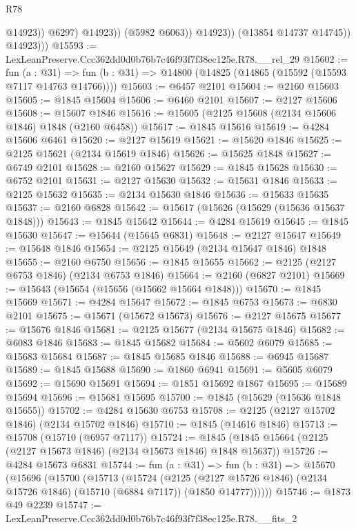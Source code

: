 \begin{lexlean}{R78}
\begin{coremodule}
                            @14923))
                        @6297)
                      @14923))
                  (@5982 @6063))
                @14923))
            (@13854 @14737 @14745))
          @14923)))
@15593 := LexLeanPreserve.Ccc362dd0d0b76b7c46f93f7f38ec125e.R78.__rel_29
@15602 := fun (a : @31) =>
  fun (b : @31) => @14800 (@14825 (@14865 (@15592 (@15593 @7117 @14763 @14766))))
@15603 := @6457 @2101
@15604 := @2160 @15603
@15605 := @1845 @15604
@15606 := @6460 @2101
@15607 := @2127 @15606
@15608 := @15607 @1846
@15616 := @15605 (@2125 @15608 (@2134 @15606 @1846) @1848 (@2160 @6458))
@15617 := @1845 @15616
@15619 := @4284 @15606 @6461
@15620 := @2127 @15619
@15621 := @15620 @1846
@15625 := @2125 @15621 (@2134 @15619 @1846)
@15626 := @15625 @1848
@15627 := @6749 @2101
@15628 := @2160 @15627
@15629 := @1845 @15628
@15630 := @6752 @2101
@15631 := @2127 @15630
@15632 := @15631 @1846
@15633 := @2125 @15632
@15635 := @2134 @15630 @1846
@15636 := @15633 @15635
@15637 := @2160 @6828
@15642 := @15617 (@15626 (@15629 (@15636 @15637 @1848)))
@15643 := @1845 @15642
@15644 := @4284 @15619
@15645 := @1845 @15630
@15647 := @15644 (@15645 @6831)
@15648 := @2127 @15647
@15649 := @15648 @1846
@15654 := @2125 @15649 (@2134 @15647 @1846) @1848
@15655 := @2160 @6750
@15656 := @1845 @15655
@15662 := @2125 (@2127 @6753 @1846) (@2134 @6753 @1846)
@15664 := @2160 (@6827 @2101)
@15669 := @15643 (@15654 (@15656 (@15662 @15664 @1848)))
@15670 := @1845 @15669
@15671 := @4284 @15647
@15672 := @1845 @6753
@15673 := @6830 @2101
@15675 := @15671 (@15672 @15673)
@15676 := @2127 @15675
@15677 := @15676 @1846
@15681 := @2125 @15677 (@2134 @15675 @1846)
@15682 := @6083 @1846
@15683 := @1845 @15682
@15684 := @5602 @6079
@15685 := @15683 @15684
@15687 := @1845 @15685 @1846
@15688 := @6945 @15687
@15689 := @1845 @15688
@15690 := @1860 @6941
@15691 := @5605 @6079
@15692 := @15690 @15691
@15694 := @1851 @15692 @1867
@15695 := @15689 @15694
@15696 := @15681 @15695
@15700 := @1845 (@15629 (@15636 @1848 @15655))
@15702 := @4284 @15630 @6753
@15708 := @2125 (@2127 @15702 @1846) (@2134 @15702 @1846)
@15710 := @1845 (@14616 @1846)
@15713 := @15708 (@15710 (@6957 @7117))
@15724 := @1845 (@1845 @15664 (@2125 (@2127 @15673 @1846) (@2134 @15673 @1846) @1848 @15637))
@15726 := @4284 @15673 @6831
@15744 := fun (a : @31) =>
  fun (b : @31) =>
  @15670
    (@15696
      (@15700
        (@15713
          (@15724
            (@2125
              (@2127 @15726 @1846)
              (@2134 @15726 @1846)
              (@15710 (@6884 @7117))
              (@1850 @14777))))))
@15746 := @1873 @49 @2239
@15747 := LexLeanPreserve.Ccc362dd0d0b76b7c46f93f7f38ec125e.R78.__fits_2

\end{coremodule}
\end{lexlean}
